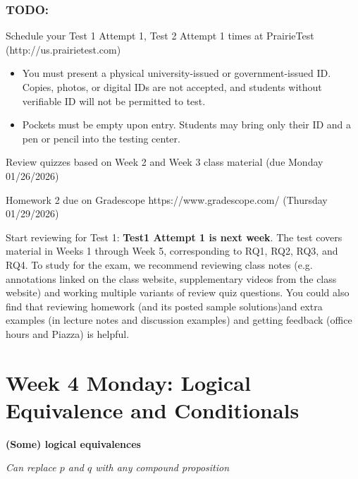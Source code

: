 \documentclass[12pt, oneside]{article}
\begin{document}
\vfill


\subsubsection*{TODO:}
\begin{list}
   {\itemsep2pt}
    \item Schedule your Test 1 Attempt 1, Test 2 Attempt 1 times at PrairieTest (http://us.prairietest.com)   
    \begin{itemize}
    \item You must present a physical university-issued or government-issued ID. Copies, photos, or digital IDs are not accepted, and students without verifiable ID will not be permitted to test. 
    \item Pockets must be empty upon entry. Students may bring only their ID and a pen or pencil into the testing center. 
    \end{itemize}

    \item Review quizzes based on Week 2 and Week 3 class material (due Monday 01/26/2026)
    \item Homework 2 due on Gradescope https://www.gradescope.com/ (Thursday 01/29/2026)
   \item Start reviewing for Test 1: {\bf Test1 Attempt 1 is next week}. The test covers material in Weeks 1 through Week 5, corresponding to RQ1, RQ2, RQ3, and RQ4. To study for the exam, we recommend reviewing class notes (e.g. annotations linked on the class website, supplementary videos from the class website) and working multiple variants of review quiz questions. You could also find that reviewing homework (and its posted sample solutions)and extra examples (in lecture notes and discussion examples) and getting feedback (office hours and Piazza) is helpful.
\end{list}

\newpage

\section*{Week 4 Monday: Logical Equivalence and Conditionals}


{\bf (Some) logical equivalences}

{\it Can replace $p$ and $q$ with any compound proposition}
\end{document}
